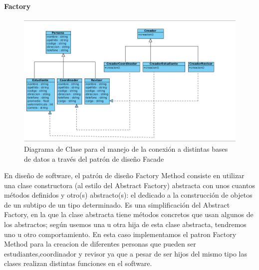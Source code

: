 \paragraph{Factory}
\begin{figure}[H]
	\centering
	\includegraphics[width=1\linewidth]{parte2/imgs/Patrones/FactoryMethod}
	\caption[Diagrama de clases del patrón Facade]{Diagrama de Clase para el manejo de la conexión a distintas bases de datos a través del patrón de diseño Facade}
	\label{fig:facade}
\end{figure}

En diseño de software, el patrón de diseño Factory Method consiste en utilizar una clase constructora (al estilo del Abstract Factory) abstracta con unos cuantos métodos definidos y otro(s) abstracto(s): el dedicado a la construcción de objetos de un subtipo de un tipo determinado. Es una simplificación del Abstract Factory, en la que la clase abstracta tiene métodos concretos que usan algunos de los abstractos; según usemos una u otra hija de esta clase abstracta, tendremos uno u otro comportamiento. En esta caso implementamos el patron Factory Method para la creacion de diferentes personas que pueden ser estudiantes,coordinador y revisor ya que a pesar de ser hijos del mismo tipo las clases realizan distintas funciones en el software. 

